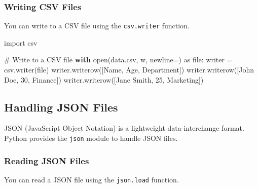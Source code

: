 \documentclass[
  letterpaper,
  DIV=11,
  numbers=noendperiod]{scrreprt}
\newenvironment{Shaded}{\begin{snugshade}}{\end{snugshade}}
\newcommand{\BuiltInTok}[1]{\textcolor[rgb]{0.00,0.23,0.31}{#1}}
\newcommand{\CommentTok}[1]{\textcolor[rgb]{0.37,0.37,0.37}{#1}}
\newcommand{\ControlFlowTok}[1]{\textcolor[rgb]{0.00,0.23,0.31}{\textbf{#1}}}
\newcommand{\DecValTok}[1]{\textcolor[rgb]{0.68,0.00,0.00}{#1}}
\newcommand{\ImportTok}[1]{\textcolor[rgb]{0.00,0.46,0.62}{#1}}
\newcommand{\NormalTok}[1]{\textcolor[rgb]{0.00,0.23,0.31}{#1}}
\newcommand{\OperatorTok}[1]{\textcolor[rgb]{0.37,0.37,0.37}{#1}}
\newcommand{\StringTok}[1]{\textcolor[rgb]{0.13,0.47,0.30}{#1}}
\begin{document}
\subsubsection{Writing CSV Files}\label{writing-csv-files}

You can write to a CSV file using the \texttt{csv.writer} function.

\begin{Shaded}
\begin{Highlighting}[]
\ImportTok{import}\NormalTok{ csv}

\CommentTok{\# Write to a CSV file}
\ControlFlowTok{with} \BuiltInTok{open}\NormalTok{(}\StringTok{\textquotesingle{}data.csv\textquotesingle{}}\NormalTok{, }\StringTok{\textquotesingle{}w\textquotesingle{}}\NormalTok{, newline}\OperatorTok{=}\StringTok{\textquotesingle{}\textquotesingle{}}\NormalTok{) }\ImportTok{as} \BuiltInTok{file}\NormalTok{:}
\NormalTok{    writer }\OperatorTok{=}\NormalTok{ csv.writer(}\BuiltInTok{file}\NormalTok{)}
\NormalTok{    writer.writerow([}\StringTok{\textquotesingle{}Name\textquotesingle{}}\NormalTok{, }\StringTok{\textquotesingle{}Age\textquotesingle{}}\NormalTok{, }\StringTok{\textquotesingle{}Department\textquotesingle{}}\NormalTok{])}
\NormalTok{    writer.writerow([}\StringTok{\textquotesingle{}John Doe\textquotesingle{}}\NormalTok{, }\DecValTok{30}\NormalTok{, }\StringTok{\textquotesingle{}Finance\textquotesingle{}}\NormalTok{])}
\NormalTok{    writer.writerow([}\StringTok{\textquotesingle{}Jane Smith\textquotesingle{}}\NormalTok{, }\DecValTok{25}\NormalTok{, }\StringTok{\textquotesingle{}Marketing\textquotesingle{}}\NormalTok{])}
\end{Highlighting}
\end{Shaded}

\subsection{Handling JSON Files}\label{handling-json-files}

JSON (JavaScript Object Notation) is a lightweight data-interchange
format. Python provides the \texttt{json} module to handle JSON files.

\subsubsection{Reading JSON Files}\label{reading-json-files}

You can read a JSON file using the \texttt{json.load} function.
\end{document}
